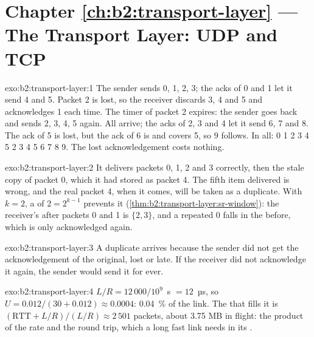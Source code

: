 \section*{Chapter \ref{ch:b2:transport-layer} --- The Transport Layer: UDP and TCP}

\begin{solution}{exo:b2:transport-layer:1}
The sender sends 0, 1, 2, 3; the acks of 0 and 1 let it send 4 and 5. Packet 2 is lost, so the receiver discards 3,
4 and 5 and acknowledges 1 each time. The timer of packet 2 expires: the sender goes back and sends 2, 3, 4, 5 again.
All arrive; the acks of 2, 3 and 4 let it send 6, 7 and 8. The ack of 5 is lost, but the ack of 6 is  and
covers 5, so 9 follows. In all: 0 1 2 3 4 5 2 3 4 5 6 7 8 9. The lost acknowledgement costs nothing.
\end{solution}

\begin{solution}{exo:b2:transport-layer:2}
It delivers packets 0, 1, 2 and 3 correctly, then the stale copy of packet 0, which it had stored as packet 4. The
fifth item delivered is wrong, and the real packet 4, when it comes, will be taken as a duplicate. With $k = 2$, a
 of $2 = 2^{k-1}$ prevents it (\cref{thm:b2:transport-layer:sr-window}): the receiver's  after packets 0
and 1 is $\{2, 3\}$, and a repeated 0 falls in the  before, which is only acknowledged again.
\end{solution}

\begin{solution}{exo:b2:transport-layer:3}
A duplicate arrives because the sender did not get the acknowledgement of the original, lost or late. If the receiver
did not acknowledge it again, the sender would send it for ever.
\end{solution}

\begin{solution}{exo:b2:transport-layer:4}
$L/R = 12\,000 / 10^9$~s $= 12$~µs, so $U = 0.012 / (30 + 0.012) \approx 0.0004$: 0.04~\% of the link. The  that
fills it is $(\mathrm{RTT} + L/R)/(L/R) \approx 2\,501$ packets, about 3.75 MB in flight: the product of the rate and
the round trip, which a long fast link needs in its .
\end{solution}


